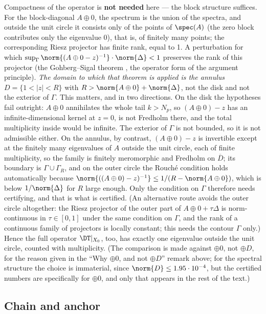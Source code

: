 Compactness of the operator is \textbf{not needed} here --- the block
structure suffices. For the block-diagonal $A \oplus 0$, the spectrum is
the union of the spectra, and outside the unit circle it consists only of
the points of $\spec(A)$ (the zero block contributes only the eigenvalue
$0$), that is, of finitely many points; the corresponding Riesz projector
has finite rank, equal to 1. A perturbation for which
$\sup_{\Gamma}\norm{(A \oplus 0 - z)^{-1}}\cdot \norm{\Delta} < 1$
preserves the rank of this projector (the Gohberg--Sigal theorem \cite{gohberg1971operator}, the
operator form of the argument principle). \emph{The domain to which that theorem
is applied is the annulus} $D = \{1 < \lvert z\rvert < R\}$ with
$R > \norm{A \oplus 0} + \norm{\Delta}$, not the disk and not the exterior of
$\Gamma$. This matters, and in two directions. On the disk the hypotheses fail
outright: $A \oplus 0$ annihilates the whole tail $k > N_{p}$, so
$(A \oplus 0) - z$ has an infinite-dimensional kernel at $z = 0$, is not Fredholm
there, and the total multiplicity inside would be infinite. The exterior of
$\Gamma$ is not bounded, so it is not admissible either. On the annulus, by
contrast, $(A \oplus 0) - z$ is invertible except at the finitely many
eigenvalues of $A$ outside the unit circle, each of finite multiplicity, so the
family is finitely meromorphic and Fredholm on $\overline{D}$; its boundary is
$\Gamma \cup \Gamma_{R}$, and on the outer circle the Rouch\'e condition holds
automatically because $\norm{((A \oplus 0) - z)^{-1}} \le 1/(R - \norm{A \oplus 0})$,
which is below $1/\norm{\Delta}$ for $R$ large enough. Only the condition on
$\Gamma$ therefore needs certifying, and that is what is certified. (An
alternative route avoids the outer circle altogether: the Riesz projector of
the outer part of $A \oplus 0 + \tau\Delta$ is norm-continuous in
$\tau \in [0,1]$ under the same condition on $\Gamma$, and the rank of a
continuous family of projectors is locally constant; this needs the contour
$\Gamma$ only.) Hence the full operator
$\DT|_{X_{0}}$, too,
has exactly one eigenvalue outside the unit circle, counted with
multiplicity. (The comparison is made against $\oplus 0$, not $\oplus D$,
for the reason given in the ``Why $\oplus 0$, and not $\oplus D$'' remark
above; for the spectral structure the
choice is immaterial, since $\norm{D} \le 1.95\cdot 10^{-4}$, but the
certified numbers are specifically for $\oplus 0$, and only that appears
in the rest of the text.)



\subsection{Chain and anchor}\label{sec:4.7}

